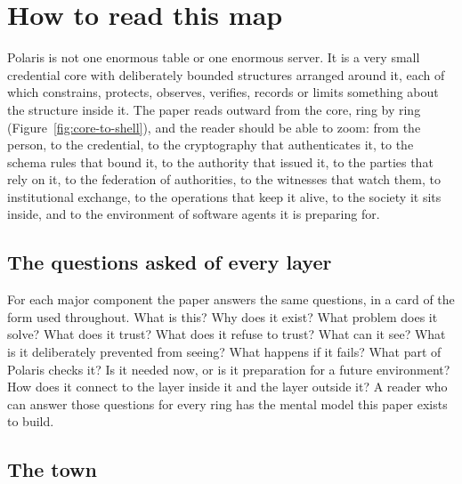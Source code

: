 \section{How to read this map}
\label{sec:reading}

Polaris is not one enormous table or one enormous server. It is a very small credential core with
deliberately bounded structures arranged around it, each of which constrains, protects, observes,
verifies, records or limits something about the structure inside it. The paper reads outward from
the core, ring by ring (Figure~\ref{fig:core-to-shell}), and the reader should be able to zoom:
from the person, to the credential, to the cryptography that authenticates it, to the schema rules
that bound it, to the authority that issued it, to the parties that rely on it, to the federation of
authorities, to the witnesses that watch them, to institutional exchange, to the operations that
keep it alive, to the society it sits inside, and to the environment of software agents it is
preparing for.


\subsection{The questions asked of every layer}

For each major component the paper answers the same questions, in a card of the form used
throughout. What is this? Why does it exist? What problem does it solve? What does it trust? What
does it refuse to trust? What can it see? What is it deliberately prevented from seeing? What happens
if it fails? What part of Polaris checks it? Is it needed now, or is it preparation for a future
environment? How does it connect to the layer inside it and the layer outside it? A reader who can
answer those questions for every ring has the mental model this paper exists to build.

\subsection{The town}

